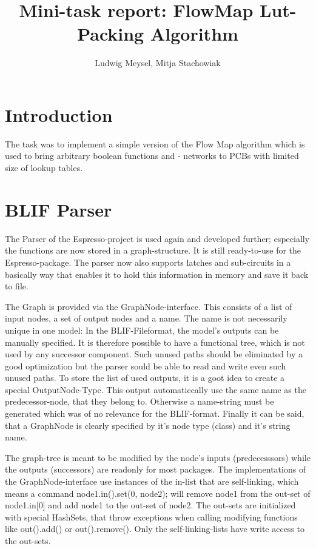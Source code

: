 \documentclass[colorback,accentcolor=tud1c,11pt]{tudreport}
\title{Mini-task report: FlowMap Lut-Packing Algorithm}
\subtitle{Ludwig Meysel, Mitja Stachowiak}
\begin{document}
\maketitle



\chapter{Introduction}
The task was to implement a simple version of the Flow Map algorithm which is used to bring arbitrary boolean functions and - networks to PCBs with limited size of lookup tables.



\chapter{BLIF Parser}
The Parser of the Espresso-project is used again and developed further; especially the functions are now stored in a graph-structure. It is still ready-to-use for the Espresso-package. The parser now also supports latches and sub-circuits in a basically way that enables it to hold this information in memory and save it back to file.

The Graph is provided via the GraphNode-interface. This consists of a list of input nodes, a set of output nodes and a name. The name is not necessarily unique in one model: In the BLIF-Fileformat, the model's outputs can be manually specified. It is therefore possible to have a functional tree, which is not used by any successor component. Such unused paths should be eliminated by a good optimization but the parser sould be able to read and write even such unused paths. To store the list of used outputs, it is a goot idea to create a special OutputNode-Type. This output automaticcally use the same name as the predecessor-node, that they belong to. Otherwise a name-string must be generated which was of no relevance for the BLIF-format. Finally it can be said, that a GraphNode is clearly specified by it's node type (class) and it's string name.

The graph-tree is meant to be modified by the node's inputs (predecesssors) while the outputs (successors) are readonly for most packages. The implementations of the GraphNode-interface use instances of the in-list that are self-linking, which means a command node1.in().set(0, node2); will remove node1 from the out-set of node1.in[0] and add node1 to the out-set of node2. The out-sets are initialized with special HashSets, that throw exceptions when calling modifying functions like out().add() or out().remove(). Only the self-linking-lists have write access to the out-sets.
\end{document}

